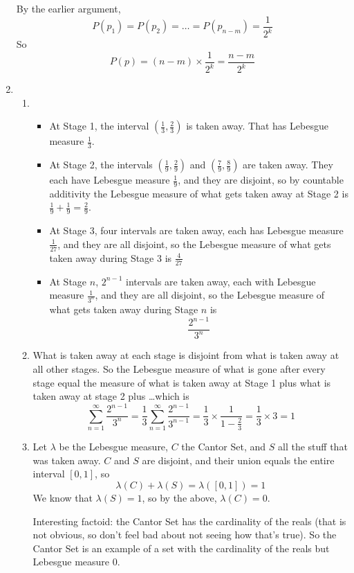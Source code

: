 \documentclass[12pt,a4paper]{article}
\begin{document}
\begin{enumerate}
By the earlier argument, $$P(p_1) = P(p_2) = \ldots =P(p_{n-m}) = \frac{1}{2^k}$$ So $$P(p) = (n-m)\times \frac{1}{2^k} = \frac{n-m}{2^k}$$

\item \begin{enumerate}
	\item \begin{itemize}
		\item At Stage 1, the interval $(\frac{1}{3}, \frac{2}{3})$ is taken away. That has Lebesgue measure $\frac{1}{3}$.
		\item At Stage 2, the intervals $(\frac{1}{9}, \frac{2}{9})$ and $(\frac{7}{9}, \frac{8}{9})$ are taken away. They each have Lebesgue measure $\frac{1}{9}$, and they are disjoint, so by countable additivity the Lebesgue measure of what gets taken away at Stage 2 is $\frac{1}{9}+\frac{1}{9}=\frac{2}{9}$.
		\item At Stage 3, four intervals are taken away, each has Lebesgue measure $\frac{1}{27}$, and they are all disjoint, so the Lebesgue measure of what gets taken away during Stage 3 is $\frac{4}{27}$
		\item At Stage $n$, $2^{n-1}$ intervals are taken away, each with Lebesgue measure $\frac{1}{3^n}$, and they are all disjoint, so the Lebesgue measure of what gets taken away during Stage $n$ is $$\frac{2^{n-1}}{3^n}$$
		\end{itemize}
	\item What is taken away at each stage is disjoint from what is taken away at all other stages. So the Lebesgue measure of what is gone after every stage equal the measure of what is taken away at Stage 1 plus what is taken away at stage 2 plus \ldots which is $$\sum_{n=1}^\infty \frac{2^{n-1}}{3^n} = \frac{1}{3}\sum_{n=1}^\infty \frac{2^{n-1}}{3^{n-1}} = \frac{1}{3}\times\frac{1}{1-\frac{2}{3}} = \frac{1}{3}\times 3 = 1$$
	\item Let $\lambda$ be the Lebesgue measure, $C$ the Cantor Set, and $S$ all the stuff that was taken away. $C$ and $S$ are disjoint, and their union equals the entire interval $[0, 1]$, so $$\lambda(C) + \lambda(S) = \lambda([0,1]) = 1$$ We know that $\lambda(S)=1$, so by the above, $\lambda(C)=0$.
	\vspace{3mm}
	
	Interesting factoid: the Cantor Set has the cardinality of the reals (that is not obvious, so don't feel bad about not seeing how that's true). So the Cantor Set is an example of a set with the cardinality of the reals but Lebesgue measure 0.
	\end{enumerate}


\end{enumerate}
\end{document}
